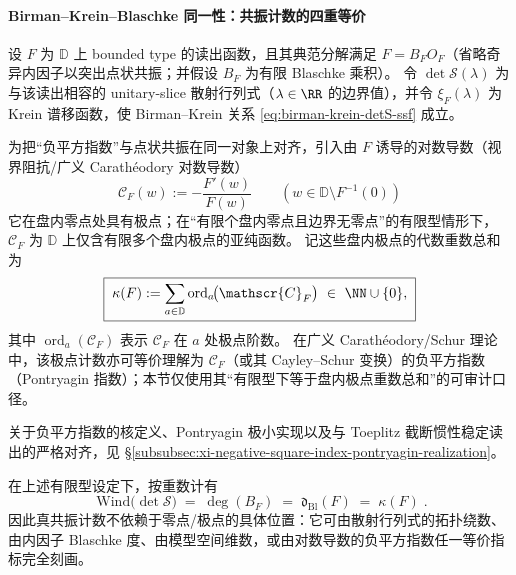 \paragraph{Birman--Krein--Blaschke 同一性：共振计数的四重等价}
设 \(F\) 为 \(\mathbb{D}\) 上 bounded type 的读出函数，且其典范分解满足 \(F=B_FO_F\)（省略奇异内因子以突出点状共振；并假设 \(B_F\) 为有限 Blaschke 乘积）。
令 \(\det\mathcal S(\lambda)\) 为与该读出相容的 unitary-slice 散射行列式（\(\lambda\in\RR\) 的边界值），并令 \(\xi_F(\lambda)\) 为 Krein 谱移函数，使 Birman--Krein 关系 \eqref{eq:birman-krein-detS-ssf} 成立。
\par
为把“负平方指数”与点状共振在同一对象上对齐，引入由 \(F\) 诱导的对数导数（视界阻抗/广义 Carath\'eodory 对数导数）
\begin{equation}\label{eq:selfdual-CF-log-derivative}
\boxed{\;
\mathscr{C}_F(w):=-\frac{F'(w)}{F(w)}\qquad(w\in\mathbb{D}\setminus F^{-1}(0))\;}
\end{equation}
它在盘内零点处具有极点；在“有限个盘内零点且边界无零点”的有限型情形下，\(\mathscr{C}_F\) 为 \(\mathbb{D}\) 上仅含有限多个盘内极点的亚纯函数。
记这些盘内极点的代数重数总和为
\begin{equation}\label{eq:selfdual-kappaF-polecount}
\boxed{\;
\kappa(F):=\sum_{a\in\mathbb{D}}\operatorname{ord}_{a}\!\bigl(\mathscr{C}_F\bigr)\ \in\ \NN\cup\{0\},\;}
\end{equation}
其中 \(\operatorname{ord}_{a}(\mathscr{C}_F)\) 表示 \(\mathscr{C}_F\) 在 \(a\) 处极点阶数。
在广义 Carath\'eodory/Schur 理论中，该极点计数亦可等价理解为 \(\mathscr{C}_F\)（或其 Cayley--Schur 变换）的负平方指数（Pontryagin 指数）；本节仅使用其“有限型下等于盘内极点重数总和”的可审计口径。
\par
关于负平方指数的核定义、Pontryagin 极小实现以及与 Toeplitz 截断惯性稳定读出的严格对齐，见 \S\ref{subsubsec:xi-negative-square-index-pontryagin-realization}。

\begin{theorem}\label{thm:selfdual-wind-deg-dbl-kappa-identity}
在上述有限型设定下，按重数计有
\begin{equation}\label{eq:selfdual-fourfold-identity}
\boxed{\;
\mathrm{Wind}\bigl(\det\mathcal S\bigr)
\;=\;
\deg(B_F)
\;=\;
\mathfrak d_{\mathrm{Bl}}(F)
\;=\;
\kappa(F)\; }.
\end{equation}
因此真共振计数不依赖于零点/极点的具体位置：它可由散射行列式的拓扑绕数、由内因子 Blaschke 度、由模型空间维数，或由对数导数的负平方指数任一等价指标完全刻画。
\end{theorem}

